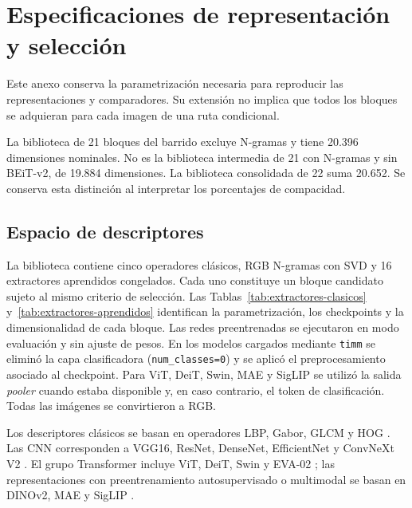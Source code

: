 \chapter{Especificaciones de representación y selección}\label{app:especificaciones}
Este anexo conserva la parametrización necesaria para reproducir las representaciones y comparadores. Su extensión no implica que todos los bloques se adquieran para cada imagen de una ruta condicional.

La biblioteca de 21 bloques del barrido excluye N-gramas y tiene 20.396 dimensiones nominales. No es la biblioteca intermedia de 21 con N-gramas y sin BEiT-v2, de 19.884 dimensiones. La biblioteca consolidada de 22 suma 20.652. Se conserva esta distinción al interpretar los porcentajes de compacidad.

\section{Espacio de descriptores}

La biblioteca contiene cinco operadores clásicos, RGB N-gramas con SVD y 16 extractores aprendidos congelados. Cada uno constituye un bloque candidato sujeto al mismo criterio de selección. Las
Tablas~\ref{tab:extractores-clasicos} y~\ref{tab:extractores-aprendidos}
identifican la parametrización, los checkpoints y la dimensionalidad de cada
bloque. Las redes preentrenadas se ejecutaron en modo evaluación y sin
ajuste de pesos. En los modelos cargados mediante \texttt{timm} se eliminó la
capa clasificadora (\texttt{num\_classes=0}) y se aplicó el preprocesamiento
asociado al checkpoint. Para ViT, DeiT, Swin, MAE y SigLIP se utilizó la salida
\emph{pooler} cuando estaba disponible y, en caso contrario, el token de
clasificación. Todas las imágenes se convirtieron a RGB.

Los descriptores clásicos se basan en operadores LBP,
Gabor, GLCM y HOG \citep{ojala2002lbp,mehta2016drlbp,jain1991gabor,haralick1979glcm,dalal2005hog}.
Las CNN corresponden a VGG16, ResNet, DenseNet, EfficientNet y ConvNeXt V2
\citep{simonyan2015vgg,he2016resnet,huang2017densenet,tan2019efficientnet,woo2023convnextv2}.
El grupo Transformer incluye ViT, DeiT, Swin y EVA-02
\citep{dosovitskiy2021vit,touvron2021deit,liu2021swin,fang2024eva02}; las
representaciones con preentrenamiento autosupervisado o multimodal se basan en
DINOv2, MAE y SigLIP \citep{oquab2024dinov2,he2022mae,zhai2023siglip}.

